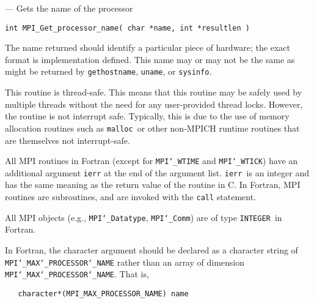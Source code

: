 \startmanpage
{}
--- Gets the name of the processor 
\startvb\begin{verbatim}
int MPI_Get_processor_name( char *name, int *resultlen )

\end{verbatim}
\endvb

\par
{}
The name returned should identify a particular piece of hardware;
the exact format is implementation defined.  This name may or may not
be the same as might be returned by {\tt gethostname}, {\tt uname}, or {\tt sysinfo}.
\par
{}
\par
This routine is thread-safe.  This means that this routine may be
safely used by multiple threads without the need for any user-provided
thread locks.  However, the routine is not interrupt safe.  Typically,
this is due to the use of memory allocation routines such as {\tt malloc
}or other non-MPICH runtime routines that are themselves not interrupt-safe.
\par
{}
All MPI routines in Fortran (except for {\tt MPI{\tt \char`\_}WTIME} and {\tt MPI{\tt \char`\_}WTICK}) have
an additional argument {\tt ierr} at the end of the argument list.  {\tt ierr
}is an integer and has the same meaning as the return value of the routine
in C.  In Fortran, MPI routines are subroutines, and are invoked with the
{\tt call} statement.
\par
All MPI objects (e.g., {\tt MPI{\tt \char`\_}Datatype}, {\tt MPI{\tt \char`\_}Comm}) are of type {\tt INTEGER
}in Fortran.
\par
In Fortran, the character argument should be declared as a character string
of {\tt MPI{\tt \char`\_}MAX{\tt \char`\_}PROCESSOR{\tt \char`\_}NAME} rather than an array of dimension
{\tt MPI{\tt \char`\_}MAX{\tt \char`\_}PROCESSOR{\tt \char`\_}NAME}.  That is,
\begin{verbatim}
   character*(MPI_MAX_PROCESSOR_NAME) name
\end{verbatim}

